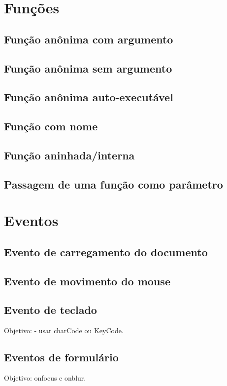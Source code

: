 \section{Funções}
\subsection{Função anônima com argumento}
\subsection{Função anônima sem argumento}
\subsection{Função anônima auto-executável}
\subsection{Função com nome}
\subsection{Função aninhada/interna}
\subsection{Passagem de uma função como parâmetro}

\section{Eventos}
\subsection{Evento de carregamento do documento}


\subsection{Evento de movimento do mouse}


\subsection{Evento de teclado}
 Objetivo:  - usar charCode ou KeyCode.
 
 
\subsection{Eventos de formulário}
Objetivo: onfocus e onblur.


